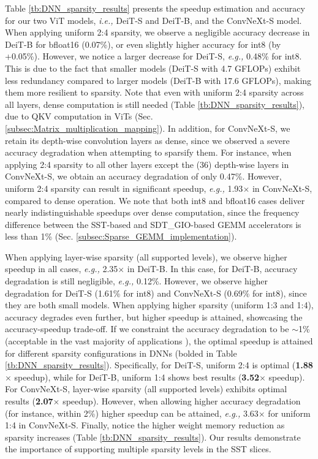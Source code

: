 \vspace{2mm}
 
Table \ref{tb:DNN_sparsity_results} presents the speedup estimation and accuracy for our two ViT models, \emph{i.e.,} DeiT-S and DeiT-B, and the ConvNeXt-S model. 
When applying uniform 2:4 sparsity, we observe a negligible accuracy decrease in DeiT-B for bfloat16 (0.07\%), or even slightly higher accuracy for int8 (by +0.05\%).
However, we notice a larger decrease for DeiT-S, \emph{e.g.,} 0.48\% for int8.
This is due to the fact that smaller models (DeiT-S with 4.7 GFLOPs) exhibit less redundancy compared to larger models (DeiT-B with 17.6 GFLOPs), making them more resilient to sparsity.
Note that even with uniform 2:4 sparsity across all layers, dense computation is still needed (Table \ref{tb:DNN_sparsity_results}), due to QKV computation in ViTs (Sec. \ref{subsec:Matrix_multiplication_mapping}).
In addition, for ConvNeXt-S, we retain its depth-wise convolution layers as dense, since we observed a severe accuracy degradation when attempting to sparsify them.
For instance, when applying 2:4 sparsity to all other layers except the (36) depth-wise layers in ConvNeXt-S, we obtain an accuracy degradation of only 0.47\%.
However, uniform 2:4 sparsity can result in significant speedup, \emph{e.g.,} 1.93$\times$ in ConvNeXt-S, 
compared to dense operation.
We note that both int8 and bfloat16 cases deliver nearly indistinguishable speedups over dense computation, since the frequency difference between the SST-based and SDT\_GIO-based GEMM accelerators  is less than 1\% (Sec. \ref{subsec:Sparse_GEMM_implementation}).


When applying layer-wise sparsity (all supported levels), we observe higher speedup in all cases, \emph{e.g.,} 2.35$\times$ in DeiT-B.
In this case, for DeiT-B, accuracy degradation is still negligible, \emph{e.g.,} 0.12\%. 
However, we observe higher degradation for DeiT-S (1.61\% for int8) and ConvNeXt-S (0.69\% for int8), since they are both small models. 
When applying higher sparsity (uniform 1:3 and 1:4), accuracy degrades even further, but higher speedup is attained, showcasing the accuracy-speedup trade-off.
If we constraint the accuracy degradation to be $\sim$1\% (acceptable in the vast majority of applications \cite{Accuracy_degradation_1_percent_NEURIPS2020}), the optimal speedup is attained for different sparsity configurations in DNNs (bolded in Table \ref{tb:DNN_sparsity_results}).
Specifically, for DeiT-S, uniform 2:4 is optimal (\textbf{1.88$\times$} speedup), while for DeiT-B, uniform 1:4 shows best results (\textbf{3.52$\times$} speedup).
For ConvNeXt-S, layer-wise sparsity (all supported levels) exhibits optimal results (\textbf{2.07$\times$} speedup).
However, when allowing higher accuracy degradation (for instance, within 2\%) higher speedup can be attained, \emph{e.g.,} 3.63$\times$ for uniform 1:4 in ConvNeXt-S.
Finally, notice the higher weight memory reduction as sparsity increases (Table \ref{tb:DNN_sparsity_results}).
Our results demonstrate the importance of supporting multiple sparsity levels in the SST slices.


